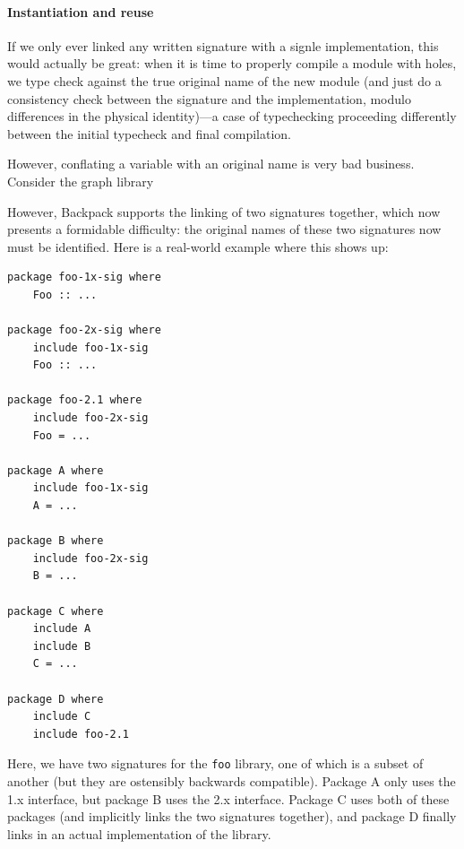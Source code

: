 \documentclass{article}
\begin{document}
\iffalse%


\paragraph{Instantiation and reuse}

If we only ever linked any written signature with a signle implementation, this would actually
be great: when it is time to properly compile a module with holes, we
type check against the true original name of the new module (and just
do a consistency check between the signature and the implementation, modulo
differences in the physical identity)---a case of typechecking proceeding
differently between the initial typecheck and final compilation.

However, conflating a variable with an original name is very bad business.
Consider the graph library 

However, Backpack supports the linking of two signatures together, which
now presents a formidable difficulty: the original names of these two
signatures now must be identified.  Here is a real-world example where
this shows up:

\begin{verbatim}
package foo-1x-sig where
    Foo :: ...

package foo-2x-sig where
    include foo-1x-sig
    Foo :: ...

package foo-2.1 where
    include foo-2x-sig
    Foo = ...

package A where
    include foo-1x-sig
    A = ...

package B where
    include foo-2x-sig
    B = ...

package C where
    include A
    include B
    C = ...

package D where
    include C
    include foo-2.1
\end{verbatim}

Here, we have two signatures for the \verb|foo| library, one of which
is a subset of another (but they are ostensibly backwards compatible).
Package A only uses the 1.x interface, but package B uses the 2.x interface.
Package C uses both of these packages (and implicitly links the two signatures
together), and package D finally links in an actual implementation of the
library.
\end{document}
